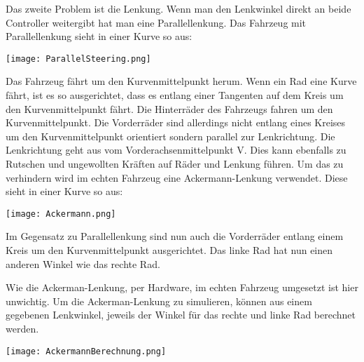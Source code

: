 Das zweite Problem ist die Lenkung. 
Wenn man den Lenkwinkel direkt an beide Controller weitergibt hat man eine Parallellenkung.
Das Fahrzeug mit Parallellenkung sieht in einer Kurve so aus:  
\begin{center}
    \texttt{[image: ParallelSteering.png]}
\end{center}
Das Fahrzeug fährt um den Kurvenmittelpunkt herum. 
Wenn ein Rad eine Kurve fährt, ist es so ausgerichtet, dass es entlang einer Tangenten auf dem Kreis um den Kurvenmittelpunkt fährt.
Die Hinterräder des Fahrzeugs fahren um den Kurvenmittelpunkt.
Die Vorderräder sind allerdings nicht entlang eines Kreises um den Kurvenmittelpunkt orientiert sondern parallel zur Lenkrichtung.
Die Lenkrichtung geht aus vom Vorderachsenmittelpunkt V.
Dies kann ebenfalls zu Rutschen und ungewollten Kräften auf Räder und Lenkung führen.
Um das zu verhindern wird im echten Fahrzeug eine Ackermann-Lenkung verwendet. 
Diese sieht in einer Kurve so aus:
\begin{center}
    \texttt{[image: Ackermann.png]}
\end{center}
Im Gegensatz zu Parallellenkung sind nun auch die Vorderräder entlang einem Kreis um den Kurvenmittelpunkt ausgerichtet.
Das linke Rad hat nun einen anderen Winkel wie das rechte Rad.

Wie die Ackerman-Lenkung, per Hardware, im echten Fahrzeug umgesetzt ist hier unwichtig.
Um die Ackerman-Lenkung zu simulieren, können aus einem gegebenen Lenkwinkel, jeweils der Winkel für das rechte und linke Rad berechnet werden.

\begin{center}
    \texttt{[image: AckermannBerechnung.png]}
\end{center}

